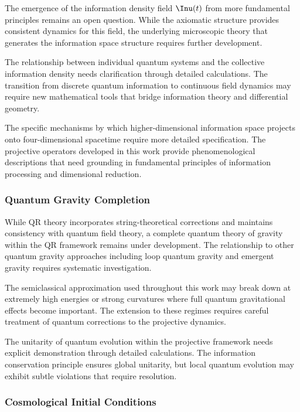 The emergence of the information density field $\Inu(t)$ from more fundamental principles remains an open question. While the axiomatic structure provides consistent dynamics for this field, the underlying microscopic theory that generates the information space structure requires further development.

The relationship between individual quantum systems and the collective information density needs clarification through detailed calculations. The transition from discrete quantum information to continuous field dynamics may require new mathematical tools that bridge information theory and differential geometry.

The specific mechanisms by which higher-dimensional information space projects onto four-dimensional spacetime require more detailed specification. The projective operators developed in this work provide phenomenological descriptions that need grounding in fundamental principles of information processing and dimensional reduction.

\subsubsection{Quantum Gravity Completion}
\label{subsubsec:quantum-gravity-completion}

While QR theory incorporates string-theoretical corrections and maintains consistency with quantum field theory, a complete quantum theory of gravity within the QR framework remains under development. The relationship to other quantum gravity approaches including loop quantum gravity and emergent gravity requires systematic investigation.

The semiclassical approximation used throughout this work may break down at extremely high energies or strong curvatures where full quantum gravitational effects become important. The extension to these regimes requires careful treatment of quantum corrections to the projective dynamics.

The unitarity of quantum evolution within the projective framework needs explicit demonstration through detailed calculations. The information conservation principle ensures global unitarity, but local quantum evolution may exhibit subtle violations that require resolution.

\subsubsection{Cosmological Initial Conditions}
\label{subsubsec:initial-conditions}

